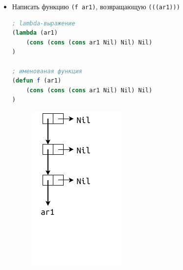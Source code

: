 \begin{itemize}
	\item Написать функцию \texttt{(f ar1)}, возвращающую \texttt{(((ar1)))}
	
\begin{lstlisting}[language=Lisp]
; lambda-выражение
(lambda (ar1)
	(cons (cons (cons ar1 Nil) Nil) Nil)
)

; именованая функция
(defun f (ar1)
	(cons (cons (cons ar1 Nil) Nil) Nil)
)
\end{lstlisting}

	\begin{figure}[ht]
		\centering
		\includegraphics[scale=1.2]{img/1-9}
	\end{figure}

\end{itemize}
